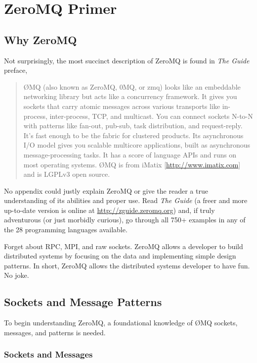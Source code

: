 \chapter{ZeroMQ Primer}
\label{zeromq_primer}

\section{Why ZeroMQ}

Not surprisingly, the most succinct description of ZeroMQ is found in \textit{The Guide}\cite{zguide} preface,

\begin{quote}
\O MQ (also known as ZeroMQ, 0MQ, or zmq) looks like an embeddable networking library but acts like a concurrency
framework. It gives you sockets that carry atomic messages across various transports like in-process, inter-process,
TCP, and multicast. You can connect sockets N-to-N with patterns like fan-out, pub-sub, task distribution, and
request-reply. It's fast enough to be the fabric for clustered products. Its asynchronous I/O model gives you scalable
multicore applications, built as asynchronous message-processing tasks. It has a score of language APIs and runs on most
operating systems. \O MQ is from iMatix [\url{http://www.imatix.com}] and is LGPLv3 open source.
\end{quote}

No appendix could justly explain ZeroMQ or give the reader a true understanding of its abilities and proper use. Read
\textit{The Guide} (a freer and more up-to-date version is online at \url{http://zguide.zeromq.org}) and, if truly
adventurous (or just morbidly curious), go through all 750+ examples in any of the 28 programming languages available.

Forget about RPC, MPI, and raw sockets. ZeroMQ allows a developer to build distributed systems by focusing on the data
and implementing simple design patterns. In short, ZeroMQ allows the distributed systems developer to have fun. No joke.

\section{Sockets and Message Patterns}

To begin understanding ZeroMQ, a foundational knowledge of \O MQ sockets, messages, and patterns is needed.

\subsection{Sockets and Messages}

